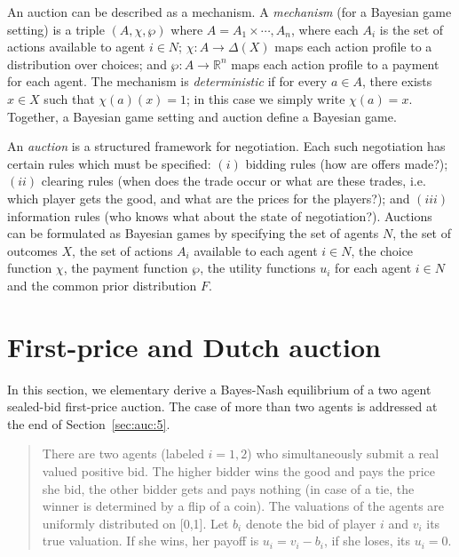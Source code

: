 An auction can be described as a mechanism. A \emph{mechanism} (for a Bayesian game setting) is a triple $(A,\chi,\wp)$ where $A=A_1\times \cdots,A_n$, where each $A_i$ is the set of actions available to agent $i\in N$; $\chi \colon A \to \Delta(X)$ maps each action profile to a distribution over choices; and $\wp \colon A \to \mathbb{R}^n$ maps each action profile to a payment for each agent. The mechanism is \emph{deterministic} if for every $a \in A$, there exists $x \in X$ such that $\chi(a)(x)=1$; in this case we simply write $\chi(a)=x$.
%
Together, a Bayesian game setting and auction define a Bayesian game.

An \emph{auction} is a structured framework for negotiation. Each such negotiation has certain rules which must be specified: $(i)$ bidding rules (how are offers made?); $(ii)$ clearing rules (when does the trade occur or what are these trades, i.e. which player gets the good, and what are the prices for the players?); and $(iii)$ information rules (who knows what about the state of negotiation?). Auctions can be formulated as Bayesian games by specifying the set of agents $N$, the set of outcomes $X$, the set of actions $A_i$ available to each agent $i \in N$, the choice function $\chi$, the payment function $\wp$, the utility functions $u_i$ for each agent $i\in N$ and the common prior distribution $F$.



\section{First-price and Dutch auction}
\label{sec:auc:3}
In this section, we elementary derive a Bayes-Nash equilibrium of a two agent sealed-bid first-price auction. The case of more than two agents is addressed at the end of Section~\ref{sec:auc:5}.

\begin{quote}
There are two agents (labeled $i=1,2$) who simultaneously submit a real valued positive bid. The higher bidder wins the good and pays the price she bid, the other bidder gets and pays nothing (in case of a tie, the winner is determined by a flip of a coin).
%
The valuations of the agents are uniformly distributed on [0,1]. Let $b_i$ denote the bid of player $i$ and $v_i$ its true valuation. If she wins, her payoff is $u_i = v_i - b_i$, if she loses, its $u_i = 0$.
\end{quote}

